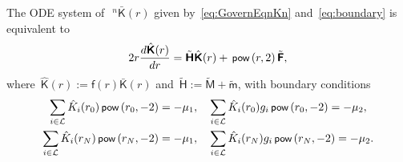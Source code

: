 \documentclass[preprint,12pt,times]{elsarticle}
\numberwithin{equation}{section}
\renewcommand{\u}[1]{\boldsymbol{#1}}
\newcommand{\usf}[1]{\u{\mathsf #1}}
\newcommand{\busf}[1]{\bar{\usf{ #1}}}
\newcommand{\pr}[1]{\left( #1 \right)}
\newcommand{\p}{\,\textsf{\small pow}}
\newcommand{\musub}[2]{\mu_{#1\cdot #2}}
\renewcommand{\>}{$\Rightarrow$}
\begin{document}
The ODE system of~$~^{n}{\busf{K}(r)}$ given by~\eqref{eq:GovernEqnKn} and~\eqref{eq:boundary} is equivalent to
\begin{equation}
	2 r \frac{d\hat{\usf{K}}(r)}{dr} = \tilde{\usf{H}} \hat{\usf{K}}(r) + \p\pr{r,2} \tilde{\usf{F}},
	\label{eq:AppendKendr}
\end{equation}
where~$\hat{\usf{K}}(r) := \usf{f}(r)\busf{K}(r)$ and~$\tilde{\usf{H}} :=\tilde{\usf{M}} + \tilde{\usf{m}}$, with boundary conditions
\begin{subequations}
	\begin{align}
	\sum_{i \in \mathcal{L}} \hat{K}_{i}(r_{0}) \p\pr{r_{0},-2} & = -\mu_{1}, \quad
	 \sum_{i \in \mathcal{L}} \hat{K}_{i}(r_{0}) {g_{i}} \p\pr{r_{0},-2} = -{\mu_{2}},\\
	\sum_{i \in \mathcal{L}} \hat{K}_{i}(r_{N}) \p\pr{r_{N},-2} & = -{\mu_{1}}, \quad
	 \sum_{i \in \mathcal{L}}\hat{K}_{i}(r_{N}) {g_{i}} \p\pr{r_{N},-2} = -{\mu_{2}}.
	\end{align}
	\label{eq:Appenboundary}
\end{subequations}
\end{document}

